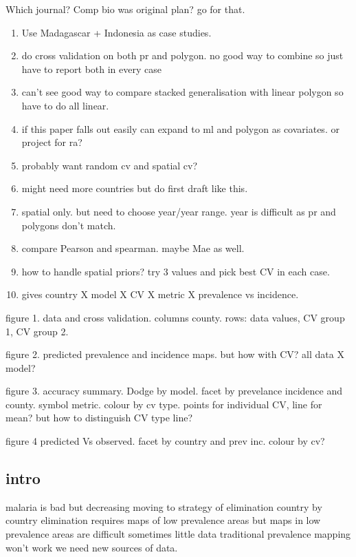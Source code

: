 Which journal? Comp bio was original plan? go for that.

\begin{enumerate}
\def\labelenumi{\arabic{enumi}.}
\tightlist
\item
  Use Madagascar + Indonesia as case studies.
\item
  do cross validation on both pr and polygon. no good way to combine so
  just have to report both in every case
\item
  can't see good way to compare stacked generalisation with linear
  polygon so have to do all linear.
\item
  if this paper falls out easily can expand to ml and polygon as
  covariates. or project for ra?
\item
  probably want random cv and spatial cv?
\item
  might need more countries but do first draft like this.
\item
  spatial only. but need to choose year/year range. year is difficult as
  pr and polygons don't match.
\item
  compare Pearson and spearman. maybe Mae as well.
\item
  how to handle spatial priors? try 3 values and pick best CV in each
  case.
\item
  gives country X model X CV X metric X prevalence vs incidence.
\end{enumerate}

figure 1. data and cross validation. columns county. rows: data values,
CV group 1, CV group 2.

figure 2. predicted prevalence and incidence maps. but how with CV? all
data X model?

figure 3. accuracy summary. Dodge by model. facet by prevelance
incidence and county. symbol metric. colour by cv type. points for
individual CV, line for mean? but how to distinguish CV type line?

figure 4 predicted Vs observed. facet by country and prev inc. colour by
cv?

\subsection{intro}\label{intro}

malaria is bad but decreasing moving to strategy of elimination country
by country elimination requires maps of low prevalence areas but maps in
low prevalence areas are difficult sometimes little data traditional
prevalence mapping won't work we need new sources of data.

